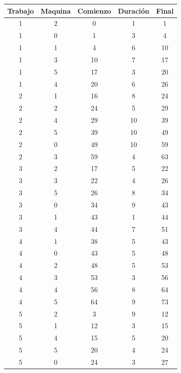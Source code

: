 \documentclass[12pt,a4paper]{article}
\begin{document}
\begin{table}[H]
    \centering
    \begin{tabular}{|c|c|c|c|c|}
    \hline
Trabajo & Maquina  & Comienzo  & Duración & Final \\
\hline
1    &  2   &   0     &    1    &   1\\
1    &  0   &   1     &    3    &   4\\
1    &  1   &   4     &    6    &  10\\
1    &  3   &  10     &    7    &  17\\
1    &  5   &  17     &    3    &  20\\
1    &  4   &  20     &    6    &  26\\
\hline
2    &  1   &  16     &    8   &   24\\
2    &  2  &   24    &     5  &    29\\
2    &  4  &   29    &    10  &    39\\
2    &  5  &   39    &    10  &    49\\
2    &  0  &   49    &    10  &    59\\
2    &  3  &   59    &     4  &    63\\
\hline
3    &  2  &   17    &     5  &    22\\
3    &  3   &  22    &     4   &   26\\
3    &  5  &   26   &      8  &    34\\
3    &  0  &   34   &      9  &    43\\
3    &  1  &   43   &      1  &    44\\
3    &   4  &   44   &      7  &    51\\
\hline
4    &    1  &   38   &      5  &    43\\
4    &    0  &   43   &      5  &    48\\
4    &    2  &   48   &      5  &    53\\
4    &     3 &    53  &       3 &     56\\
4    &     4 &    56  &       8 &     64\\
4    &     5 &    64  &       9 &     73\\
\hline
5    &     2 &     3  &       9 &     12\\
5    &     1 &    12  &       3 &     15\\
5    &     4  &   15   &      5    &  20\\
5    &     5   &  20   &      4    &  24\\
5    &      0   &  24  &       3   &   27\\

\end{tabular}
\end{table}
\end{document}

